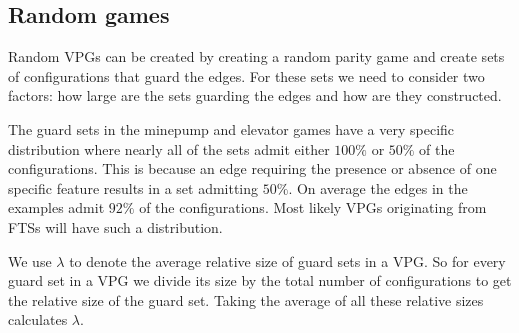 \subsection{Random games}
Random VPGs can be created by creating a random parity game and create sets of configurations that guard the edges. For these sets we need to consider two factors: how large are the sets guarding the edges and how are they constructed.

The guard sets in the minepump and elevator games have a very specific distribution where nearly all of the sets admit either $100\%$ or $50\%$ of the configurations. This is because an edge requiring the presence or absence of one specific feature results in a set admitting $50\%$. On average the edges in the examples admit $92\%$ of the configurations. Most likely VPGs originating from FTSs will have such a distribution.

We use $\lambda$ to denote the average relative size of guard sets in a VPG. So for every guard set in a VPG we divide its size by the total number of configurations to get the relative size of the guard set. Taking the average of all these relative sizes calculates $\lambda$.

